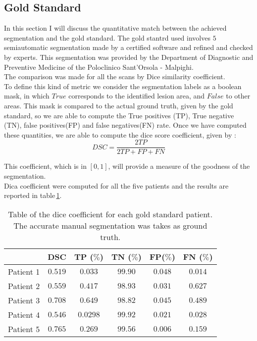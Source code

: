 \documentclass{standalone}
\begin{document}
	\subsection{Gold Standard}
	
	In this section I will discuss the quantitative match between the achieved segmentation and the gold standard. The gold stantrd used involves $5$ semiautomatic segmentation made by a certified software and refined and checked by experts. This segmentation was provided by the Department of Diagnostic and Preventive Medicine of the Poloclinico Sant'Orsola - Malpighi.\\
	The comparison was made for all the scans by Dice similarity coefficient.\\
	To define this kind of metric we consider the segmentation labels as a boolean mask, in which $True$ corresponds to the identified lesion area, and $False$ to other areas. This mask is compared to the actual ground truth, given by the gold standard, so we are able to compute the True positives (TP), True negative (TN), false positives(FP) and false negatives(FN) rate. Once we have computed these quantities, we are able to compute the dice score coefficient, given by :  
	\begin{equation}
		DSC = \frac{2TP}{2TP + FP + FN}
	\end{equation}

	This coefficient, which is in $[0, 1]$, will provide a measure of the goodness of the segmentation.\\ Dica coefficient were computed for all the five patients and the results are reported in table\,\ref{tab:DSC}. 
	
	\begin{table}[h!]
		\centering
		\begin{tabular}{|c|c|c|c|c|c|}
			\hline
				  &DSC		&TP	($\%$)	&TN	($\%$)&FP($\%$)	&FN	($\%$)	\\ \hline
		Patient 1 &	$0.519$	& $0.033$	& $99.90$ &	$0.048$	& $0.014$	\\
		Patient 2 & $0.559$	& $0.417$	& $98.93$ &	$0.031$	& $0.627$	\\
		Patient 3 &	$0.708$	& $0.649$	& $98.82$ & $0.045$	& $0.489$	\\
		Patient 4 &	$0.546$	& $0.0298$	& $99.92$ &	$0.021$	& $0.028$	\\
		Patient 5 &	$0.765$	& $0.269$	& $99.56$ &	$0.006$	& $0.159$	\\ \hline

		\end{tabular}\caption{Table of the dice coefficient for each gold standard patient. The accurate manual segmentation was takes as ground truth. }\label{tab:DSC}
	\end{table}
\end{document}
